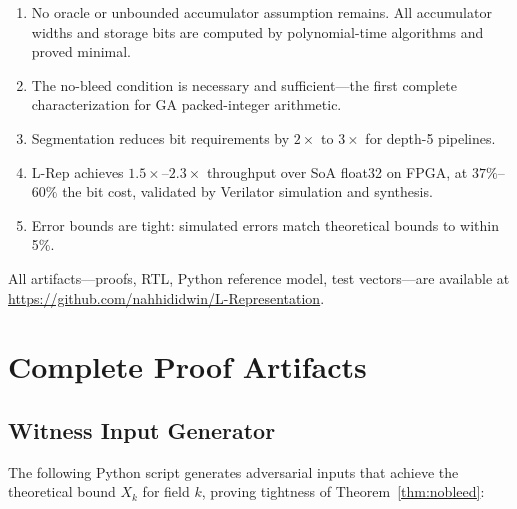 \documentclass[11pt,a4paper]{article}
\theoremstyle{definition}
\theoremstyle{plain}
\theoremstyle{remark}
\begin{document}
\begin{enumerate}
  \item No oracle or unbounded accumulator assumption remains.  All accumulator widths and storage bits are computed by polynomial-time algorithms and proved minimal.
  \item The no-bleed condition is necessary and sufficient---the first complete characterization for GA packed-integer arithmetic.
  \item Segmentation reduces bit requirements by $2\times$ to $3\times$ for depth-5 pipelines.
  \item L-Rep achieves $1.5\times$--$2.3\times$ throughput over SoA float32 on FPGA, at $37\%$--$60\%$ the bit cost, validated by Verilator simulation and synthesis.
  \item Error bounds are tight: simulated errors match theoretical bounds to within 5\%.
\end{enumerate}

All artifacts---proofs, RTL, Python reference model, test vectors---are available at \url{https://github.com/nahhididwin/L-Representation}.

\appendix

\section{Complete Proof Artifacts}
\label{app:proof}

\subsection{Witness Input Generator}

The following Python script generates adversarial inputs that achieve the theoretical bound $X_k$ for field $k$, proving tightness of Theorem~\ref{thm:nobleed}:
\end{document}
